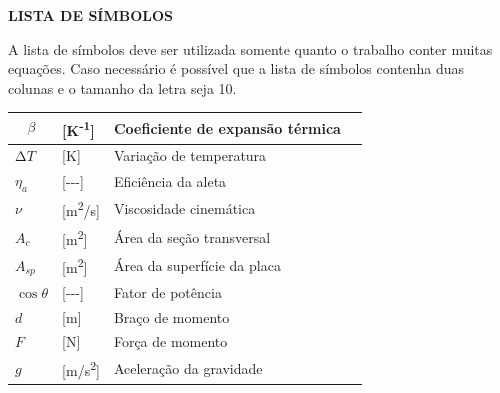 \documentclass[
]{article}
\begin{document}
\textbf{LISTA DE SÍMBOLOS}

A lista de símbolos deve ser utilizada somente quanto o trabalho conter
muitas equações. Caso necessário é possível que a lista de símbolos
contenha duas colunas e o tamanho da letra seja 10.

\begin{longtable}[]{@{}
  >{\raggedright\arraybackslash}p{}
  >{\raggedright\arraybackslash}p{}
  >{\raggedright\arraybackslash}p{}
  >{\raggedright\arraybackslash}p{}@{}}
\toprule\noalign{}
\begin{minipage}[b]{\linewidth}\raggedright
\[\beta\]
\end{minipage} & \begin{minipage}[b]{\linewidth}\raggedright
{[}K\textsuperscript{-1}{]}
\end{minipage} & \begin{minipage}[b]{\linewidth}\raggedright
Coeficiente de expansão térmica
\end{minipage} & \begin{minipage}[b]{\linewidth}\raggedright
\end{minipage} \\
\midrule\noalign{}
\endhead
\bottomrule\noalign{}
\endlastfoot
\(\mathrm{\Delta}T\) & {[}K{]} & Variação de temperatura & \\
\(\eta_{a}\) & {[}-\/-\/-{]} & Eficiência da aleta & \\
\(\nu\) & {[}m\textsuperscript{2}/s{]} & Viscosidade cinemática & \\
\(A_{c}\) & {[}m\textsuperscript{2}{]} & Área da seção transversal & \\
\(A_{sp}\) & {[}m\textsuperscript{2}{]} & Área da superfície da placa
& \\
\(\cos\theta\) & {[}-\/-\/-{]} & Fator de potência & \\
\(d\) & {[}m{]} & Braço de momento & \\
\(F\) & {[}N{]} & Força de momento & \\
\(g\) & {[}m/s\textsuperscript{2}{]} & Aceleração da gravidade & \\
\end{longtable}
\end{document}

